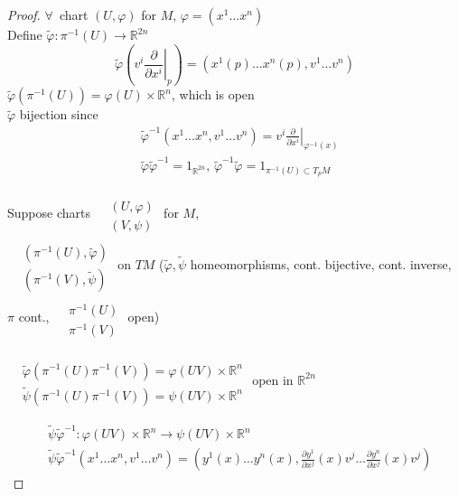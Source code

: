\begin{proof}
$\forall \, $ chart $(U, \varphi) $ for $M$, $\varphi = (x^1 \dots x^n)$  \\
Define $\widetilde{\varphi} : \pi^{-1}(U) \to \mathbb{R}^{2n}$
\[
\widetilde{\varphi}\left( v^i \left. \frac{ \partial }{ \partial x^i } \right|_p \right) = (x^1(p) \dots x^n(p), v^1 \dots v^n)
\]
$\widetilde{\varphi}(\pi^{-1}(U)) = \varphi(U) \times \mathbb{R}^n$, which is open \\
$\widetilde{\varphi}$ bijection since
\[
\begin{aligned}
  & \widetilde{\varphi}^{-1}(x^1 \dots x^n, v^1 \dots v^n) = v^i \left. \frac{ \partial }{ \partial x^i} \right|_{\varphi^{-1}(x)} \\ 
  & \widetilde{\varphi} \widetilde{\varphi}^{-1} = 1_{\mathbb{R}^{2n}}, \, \widetilde{\varphi}^{-1} \widetilde{\varphi} = 1_{ \pi^{-1}(U) \subset T_pM }
\end{aligned}
\]

Suppose charts $\begin{aligned} & \quad \\ 
  & (U, \varphi) \\ 
  & (V, \psi ) \end{aligned}$ for $M$, \\
$\begin{aligned} & \quad \\ 
  & (\pi^{-1}(U), \widetilde{\varphi}) \\ 
  & ( \pi^{-1}(V), \widetilde{\psi} ) \end{aligned}$ on $TM$ ($\widetilde{\varphi}, \widetilde{\psi}$ homeomorphisms, cont. bijective, cont. inverse, $\pi$ cont., $\begin{aligned} & \quad \\ 
  & \pi^{-1}(U) \\ & \pi^{-1}(V) \end{aligned}$ open) 

$\begin{aligned} & \quad \\ 
  & \widetilde{\varphi}( \pi^{-1}(U) \pi^{-1}(V) ) = \varphi(UV) \times \mathbb{R}^n \\
  & \widetilde{\psi}(\pi^{-1}(U) \pi^{-1}(V)) =  \psi(UV)\times \mathbb{R}^n \end{aligned}$ open in $\mathbb{R}^{2n}$

\[
\begin{aligned}
  & \widetilde{\psi} \widetilde{\varphi}^{-1} : \varphi(UV) \times \mathbb{R}^n \to \psi(UV) \times \mathbb{R}^n \\ 
  & \widetilde{\psi} \widetilde{\varphi}^{-1}(x^1 \dots x^n, v^1 \dots v^n) = (y^1(x) \dots y^n(x), \frac{ \partial y^1}{ \partial x^j}(x) v^j \dots \frac{ \partial y^n}{ \partial x^j}(x) v^j )
\end{aligned}
\]


\end{proof}
